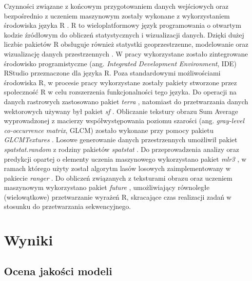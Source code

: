 \documentclass{amuthesis}
\begin{document}
Czynności związane z końcowym przygotowaniem danych wejściowych oraz
bezpośrednio z uczeniem maszynowym zostały wykonane z wykorzystaniem
środowiska języka R \autocite{R-base}. R to wieloplatformowy język
programowania o otwartym kodzie źródłowym do obliczeń statystycznych i
wizualizacji danych. Dzięki dużej liczbie pakietów R obsługuje również
statystki geoprzestrzenne, modelowanie oraz wizualizację danych
przestrzennych \autocite{lovelace_2019_geocomputation}. W pracy
wykorzystane zostało zintegrowane środowisko programistyczne (ang.
\emph{Integrated Development Environment}, IDE) RStudio
\autocite{rstudio_team_2020_rstudio} przeznaczone dla języka R. Poza
standardowymi możliwościami środowiska R, w procesie pracy wykorzystane
zostały pakiety stworzone przez społeczność R w celu rozszerzenia
funkcjonalności tego języka. Do operacji na danych rastrowych
zastosowano pakiet \emph{terra} \autocite{R-terra}, natomiast do
przetwarzania danych wektorowych używany był pakiet \emph{sf}
\autocite{R-sf}. Obliczanie tekstury obrazu Sum Average wyprowadzonej z
macierzy współwystępowania poziomu szarości (ang. \emph{gray-level
co-occurrence matrix}, GLCM) zostało wykonane przy pomocy pakietu
\emph{GLCMTextures} \autocite{R-GLCMTextures}. Losowe generowanie danych
przestrzennych umożliwił pakiet \emph{spatstat.random}
\autocite{R-spatstat.random} z rodziny pakietów \emph{spatstat}
\autocite{R-spatstat}. Do przeprowadzenia analizy oraz predykcji opartej
o elementy uczenia maszynowego wykorzystano pakiet \emph{mlr3}
\autocite{R-mlr3}, w ramach którego użyty został algorytm lasów losowych
zaimplementowany w pakiecie \emph{ranger} \autocite{R-ranger}. Do
obliczeń związanych z teksturami obrazu oraz uczeniem maszynowym
wykorzystano pakiet \emph{future} \autocite{R-future}, umożliwiający
równoległe (wielowątkowe) przetwarzanie wyrażeń R, skracające czas
realizacji zadań w stosunku do przetwarzania sekwencyjnego.


\hypertarget{sec-wyniki}{%
\chapter{Wyniki}\label{sec-wyniki}}

\hypertarget{ocena-jakoux15bci-modeli-1}{%
\section{Ocena jakości modeli}\label{ocena-jakoux15bci-modeli-1}}
\end{document}
